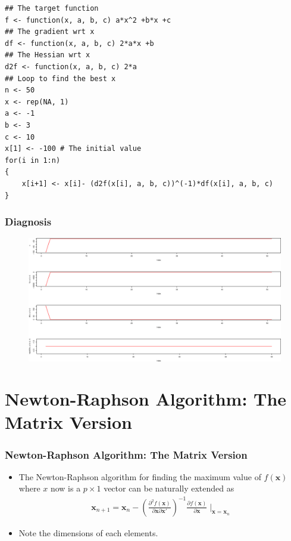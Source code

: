 \documentclass[10pt]{beamer}
\begin{document}
\begin{frame}[fragile]
\begin{verbatim}
## The target function
f <- function(x, a, b, c) a*x^2 +b*x +c
## The gradient wrt x
df <- function(x, a, b, c) 2*a*x +b
## The Hessian wrt x
d2f <- function(x, a, b, c) 2*a
## Loop to find the best x
n <- 50
x <- rep(NA, 1)
a <- -1
b <- 3
c <- 10
x[1] <- -100 # The initial value
for(i in 1:n)
{
    x[i+1] <- x[i]- (d2f(x[i], a, b, c))^(-1)*df(x[i], a, b, c)
}
\end{verbatim}
\end{frame}

\begin{frame}
\frametitle{Diagnosis}

\begin{figure}
  \centering
  \includegraphics[width=\textwidth]{NewtonRaphsonMax}
\end{figure}
\end{frame}

\section{Newton-Raphson Algorithm: The Matrix Version}
\begin{frame}
  \frametitle{Newton-Raphson Algorithm: The Matrix Version}
  \begin{itemize}
  \item The Newton-Raphson algorithm for finding the maximum value of
    $f(\bm{x})$ where $x$ now is a $p\times 1$ vector can be naturally extended as
    \begin{align*}
      \bm{x}_{n+1} = \bm{x}_n - \left( \frac{\partial ^2
          f(\bm{x})}{\partial \bm{x} \partial \bm{x}'}
      \right)^{-1} \frac{\partial f(\bm{x})}{\partial \bm{x}} \mid_{\bm{x}=\bm{x}_n}
    \end{align*}

  \item Note the dimensions of each elements.

  \end{itemize}
\end{frame}
\end{document}
